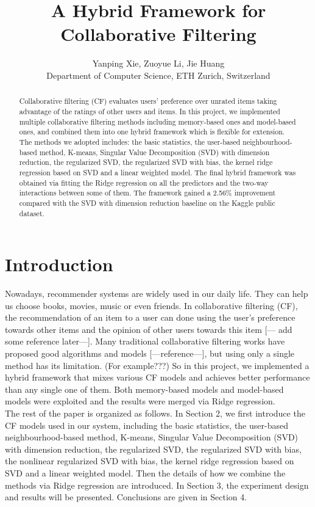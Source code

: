 \documentclass[10pt,conference,compsocconf]{IEEEtran}
\begin{document}
\title{A Hybrid Framework for Collaborative Filtering}

\author{
  Yanping Xie, Zuoyue Li, Jie Huang\\
  Department of Computer Science, ETH Zurich, Switzerland
}

\maketitle

\begin{abstract}
Collaborative filtering (CF) evaluates users' preference over unrated items taking advantage of the ratings of other
users and items. In this project, we implemented multiple collaborative filtering methods including memory-based ones and model-based ones,
and combined them into one hybrid framework which is flexible for extension. The methods we adopted includes: the basic statistics, the user-based neighbourhood-based method, K-means, Singular Value Decomposition (SVD) with dimension reduction, the regularized SVD, the regularized SVD with bias, the kernel ridge regression based on SVD and a linear weighted model. The final hybrid framework was obtained via fitting the Ridge regression on all the predictors and the two-way interactions between some of them. The framework gained a 2.56\% improvement compared with the SVD with dimension reduction baseline on the Kaggle public dataset.

\end{abstract}

\section{Introduction}

Nowadays, recommender systems are widely used in our daily life. They can help us choose books, movies, music or even friends. In collaborative filtering (CF), the recommendation of an item to a user can done using the user's preference towards other items and the opinion of other users towards this item [--- add some reference later---]. Many traditional collaborative filtering works have proposed good algorithms and models [---reference---], but using only a single method has its limitation. (For example???) So in this project, we implemented a hybrid framework that mixes various CF models and achieves better performance than any single one of them. Both memory-based models and model-based models were exploited and the results were merged via Ridge regression. \\
The rest of the paper is organized as follows. In Section 2, we first introduce the CF models used in our system, including the basic statistics, the user-based neighbourhood-based method, K-means, Singular Value Decomposition (SVD) with dimension reduction, the regularized SVD, the regularized SVD with bias, the nonlinear regularized SVD with bias, the kernel ridge regression based on SVD and a linear weighted model. Then the details of how we combine the methods via Ridge regression are introduced. In Section 3, the experiment design and results will be presented. Conclusions are given in Section 4.
\end{document}
